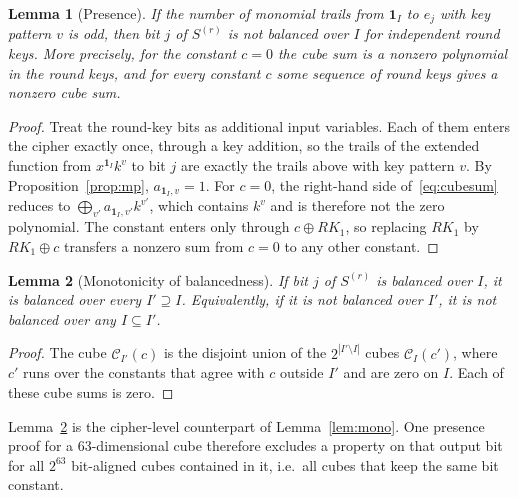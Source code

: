 \documentclass[pdflatex,sn-mathphys-num]{sn-jnl}
\theoremstyle{thmstyleone}
\newtheorem{lemma}{Lemma}
\theoremstyle{thmstylethree}
\theoremstyle{thmstyletwo}
\begin{document}
\begin{lemma}[Presence]\label{lem:presence}
If the number of monomial trails from $\mathbf 1_I$ to $e_j$ with key pattern $v$ is odd, then bit $j$ of $S^{(r)}$ is not balanced over $I$ for independent round keys. More precisely, for the constant $c=0$ the cube sum is a nonzero polynomial in the round keys, and for every constant $c$ some sequence of round keys gives a nonzero cube sum.
\end{lemma}
\begin{proof}
Treat the round-key bits as additional input variables. Each of them enters the cipher exactly once, through a key addition, so the trails of the extended function from $x^{\mathbf 1_I}k^v$ to bit $j$ are exactly the trails above with key pattern $v$. By Proposition~\ref{prop:mp}, $a_{\mathbf 1_I,v}=1$. For $c=0$, the right-hand side of~\eqref{eq:cubesum} reduces to $\bigoplus_{v'}a_{\mathbf 1_I,v'}k^{v'}$, which contains $k^v$ and is therefore not the zero polynomial. The constant enters only through $c\oplus RK_1$, so replacing $RK_1$ by $RK_1\oplus c$ transfers a nonzero sum from $c=0$ to any other constant.
\end{proof}

\begin{lemma}[Monotonicity of balancedness]\label{lem:monobal}
If bit $j$ of $S^{(r)}$ is balanced over $I$, it is balanced over every $I'\supseteq I$. Equivalently, if it is not balanced over $I'$, it is not balanced over any $I\subseteq I'$.
\end{lemma}
\begin{proof}
The cube $\mathcal C_{I'}(c)$ is the disjoint union of the $2^{|I'\setminus I|}$ cubes $\mathcal C_I(c')$, where $c'$ runs over the constants that agree with $c$ outside $I'$ and are zero on $I$. Each of these cube sums is zero.
\end{proof}
Lemma~\ref{lem:monobal} is the cipher-level counterpart of Lemma~\ref{lem:mono}. One presence proof for a 63-dimensional cube therefore excludes a property on that output bit for all $2^{63}$ bit-aligned cubes contained in it, i.e.\ all cubes that keep the same bit constant.
\end{document}
